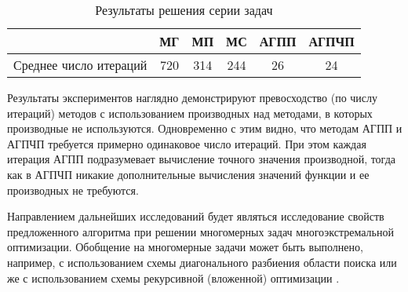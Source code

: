 \documentclass[11pt, oneside, a4paper]{article}
\begin{document}
\begin{table}[h]
	\caption{Результаты решения серии задач}
	\begin{center}
		\begin{tabular}{|c|c|c|c|c|c|}
			\hline
			& МГ & МП & МС & АГПП & АГПЧП \\
			\hline
			\hline
			Среднее число итераций & 720 & 314 & 244 & 26 & 24  \\
			\hline
		\end{tabular}
	\end{center}
\end{table}

Результаты экспериментов наглядно демонстрируют превосходство (по числу итераций) методов с использованием производных над методами, в которых производные не используются. Одновременно с этим видно, что методам АГПП и АГПЧП требуется примерно одинаковое число итераций. При этом каждая итерация АГПП подразумевает вычисление точного значения производной, тогда как в АГПЧП никакие дополнительные вычисления значений функции и ее производных не требуются.

Направлением дальнейших исследований будет являться исследование свойств предложенного алгоритма при решении многомерных задач многоэкстремальной оптимизации. Обобщение на многомерные задачи может быть выполнено, например, с использованием схемы диагонального разбиения области поиска \cite{Sergeyev2008} или же с использованием схемы рекурсивной (вложенной) оптимизации \cite{Grishagin2007}.
\end{document}
